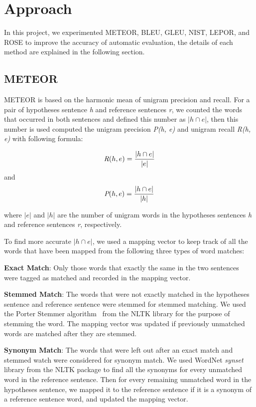 \documentclass[11pt]{article}
\begin{document}
\section{Approach}
In this project, we experimented METEOR, BLEU, GLEU, NIST, LEPOR, and ROSE to improve the accuracy of automatic evaluation, the details of each method are explained in the following section.

\subsection{METEOR}

METEOR \cite{StatMT:08} is based on the harmonic mean of unigram precision and recall. For a pair of hypotheses sentence \emph{h} and reference sentences \emph{r}, we counted the words that occurred in both sentences and defined this number as $\left | h \cap e\right |$, then this number is used computed the unigram precision \emph{P(h, e)} and unigram recall \emph{R(h, e)} with following formula:

\begin{equation}
\emph{R}(h,e)=\frac{\left | h \cap e\right | }{\left | e \right |} 
\end{equation}
and 
\begin{equation}
 \emph{P}(h,e)=\frac{\left | h \cap e\right | }{\left | h \right |}
\end{equation}

where $\left | e \right |$ and $\left | h \right |$ are the number of unigram words in the hypotheses sentences \emph{h} and reference sentences \emph{r}, respectively.

To find more accurate $\left | h \cap e\right |$, we used a mapping vector to keep track of all the words that have been mapped from the following three types of word matches:

{\bf Exact Match}: Only those words that exactly the same in the two sentences were tagged as matched and recorded in the mapping vector.

{\bf Stemmed Match}: The words that were not exactly matched in the hypotheses sentence and reference sentence were stemmed for stemmed matching. We used the Porter Stemmer algorithm~\cite{Porter:06} from the NLTK library for the purpose of stemming the word. The mapping vector was updated if previously unmatched words are matched after they are stemmed.

{\bf Synonym Match}: The words that were left out after an exact match and stemmed watch were considered for synonym match. We used WordNet \emph{synset} library from the NLTK package to find all the synonyms for every unmatched word in the reference sentence. Then for every remaining unmatched word in the hypotheses sentence, we mapped it to the reference sentence if it is a synonym of a reference sentence word, and updated the mapping vector.
\end{document}
